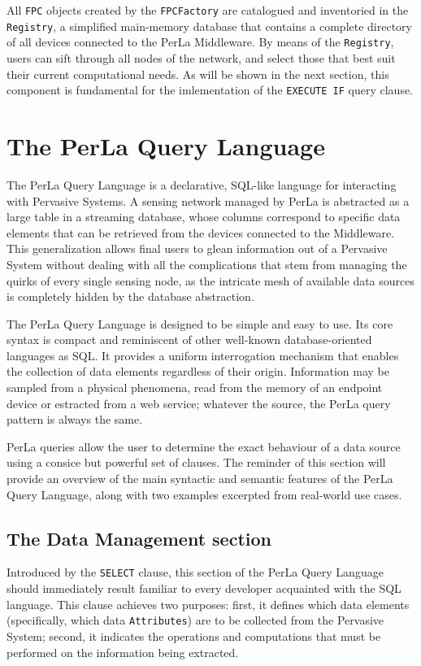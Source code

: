 All \texttt{FPC} objects created by the \texttt{FPCFactory} are catalogued and
inventoried in the \texttt{Registry}, a simplified main-memory database that
contains a complete directory of all devices connected to the PerLa Middleware.
By means of the \texttt{Registry}, users can sift through all nodes of the
network, and select those that best suit their current computational needs. As
will be shown in the next section, this component is fundamental for the
imlementation of the \texttt{EXECUTE IF} query clause.

\section{The PerLa Query Language}
\label{sec:language}

The PerLa Query Language is a declarative, SQL-like language for interacting
with Pervasive Systems. A sensing network managed by PerLa is abstracted as a
large table in a streaming database, whose columns correspond to specific data
elements that can be retrieved from the devices connected to the Middleware.
This generalization allows final users to glean information out of a Pervasive
System without dealing with all the complications that stem from managing the
quirks of every single sensing node, as the intricate mesh of available data
sources is completely hidden by the database abstraction.

The PerLa Query Language is designed to be simple and easy to use. Its core
syntax is compact and reminiscent of other well-known database-oriented
languages as SQL. It provides a uniform interrogation mechanism that enables
the collection of data elements regardless of their origin. Information may be
sampled from a physical phenomena, read from the memory of an endpoint device
or estracted from a web service; whatever the source, the PerLa query pattern
is always the same.

PerLa queries allow the user to determine the exact behaviour of a data source
using a consice but powerful set of clauses. The reminder of this section will
provide an overview of the main syntactic and semantic features of the PerLa
Query Language, along with two examples excerpted from real-world use cases.

\subsection{The Data Management section}

Introduced by the \texttt{SELECT} clause, this section of the PerLa Query
Language should immediately result familiar to every developer acquainted with
the SQL language. This clause achieves two purposes: first, it defines which
data elements (specifically, which data \texttt{Attributes}) are to be
collected from the Pervasive System; second, it indicates the operations and
computations that must be performed on the information being extracted.

